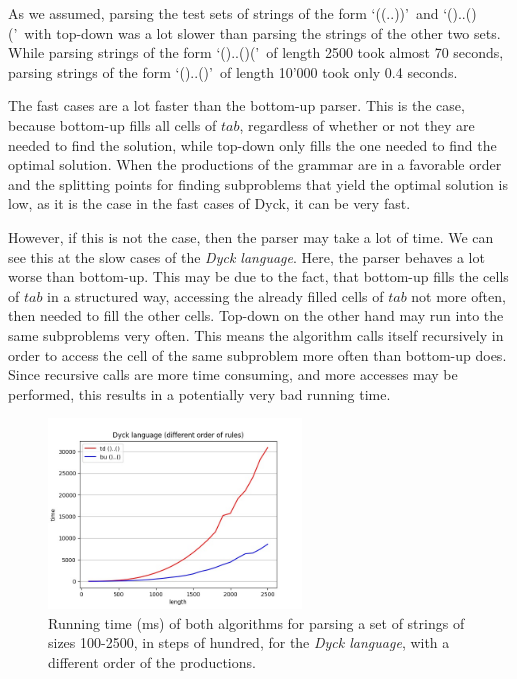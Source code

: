 As we assumed, parsing the test sets of strings of the form \lq((..))\rq~and \lq()..()(\rq~with top-down was a lot slower than parsing the strings of the other two sets.
While parsing strings of the form \lq()..()(\rq~of length 2500 took almost 70 seconds, parsing strings of the form \lq()..()\rq~of length 10'000 took only 0.4 seconds.

The fast cases are a lot faster than the bottom-up parser.
This is the case, because bottom-up fills all cells of $tab$, regardless of whether or not they are needed to find the solution, while top-down only fills the one needed to find the optimal solution.
When the productions of the grammar are in a favorable order and the splitting points for finding subproblems that yield the optimal solution is low, as it is the case in the fast cases of Dyck, it can be very fast.

However, if this is not the case, then the parser may take a lot of time.
We can see this at the slow cases of the \textit{Dyck language}.
Here, the parser behaves a lot worse than bottom-up.
This may be due to the fact, that bottom-up fills the cells of $tab$ in a structured way, accessing the already filled cells of $tab$ not more often, then needed to fill the other cells.
Top-down on the other hand may run into the same subproblems very often.
This means the algorithm calls itself recursively in order to access the cell of the same subproblem more often than bottom-up does.
Since recursive calls are more time consuming, and more accesses may be performed, this results in a potentially very bad running time.

\begin{figure}[h!]
    \centering
    \includegraphics[width=0.6\textwidth]{Resources/t_dyck_order.jpg}
    \caption{Running time (ms) of both algorithms for parsing a set of strings of sizes 100-2500, in steps of hundred, for the \textit{Dyck language}, with a different order of the productions.}
    \label{fig:t_dyck_order}
\end{figure}

